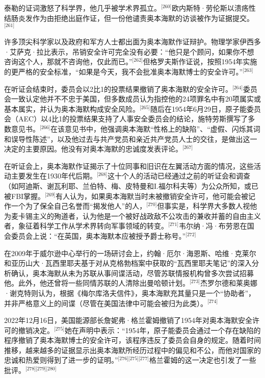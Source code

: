 泰勒的证词激怒了科学界，他几乎被学术界孤立。\(^\text{[260]}\)欧内斯特·劳伦斯以溃疡性结肠炎发作为由拒绝出庭作证，但一份他谴责奥本海默的访谈被作为证据提交。\(^\text{[261]}\)

许多顶尖科学家以及政府和军方人士都出面为奥本海默作证辩护。物理学家伊西多·艾萨克·拉比表示，吊销安全许可完全没有必要：“他只是个顾问，如果你不想咨询这个人，那就不咨询他，仅此而已。”\(^\text{[262]}\)但格罗夫斯作证说，按照1954年实施的更严格的安全标准，“如果是今天，我不会批准奥本海默博士的安全许可。”\(^\text{[263]}\)

在听证会结束时，委员会以2比1的投票结果撤销了奥本海默的安全许可。\(^\text{[264]}\)委员会一致认定他并不不忠于美国，但多数成员认为指控他的24项罪名中有20项属实或基本属实，并认为奥本海默构成安全风险。\(^\text{[265]}\)随后在1954年6月29日，原子能委员会（AEC）以4比1的投票结果支持了人事安全委员会的结论，施特劳斯撰写了多数意见书。\(^\text{[266]}\)在该意见书中，他强调奥本海默“性格上的缺陷”、“虚假、闪烁其词和误导性陈述”，以及他过去与共产党员和亲近共产党员人士的交往，是做出这一决定的主要原因。他没有对奥本海默的忠诚度发表评论。\(^\text{[267]}\)

在听证会上，奥本海默作证揭示了十位同事和旧识在左翼活动方面的情况，这些活动主要发生在1930年代后期。\(^\text{[268]}\)这十个人的活动已经通过之前的听证会和调查（如阿迪斯、谢瓦利耶、兰伯特、梅、皮特曼和I.福尔科夫等）为公众所知，或已被FBI掌握。\(^\text{[269]}\)有人认为，如果奥本海默当时未被撤销安全许可，他可能会被记作一个为了保全自己名誉而“揭发他人”的人，\(^\text{[270]}\)但事实是，科学界大多数人视他为麦卡锡主义的殉道者，认为他是一个被好战政敌不公攻击的兼收并蓄的自由主义者，象征着科学工作从学术界转向军事领域的转变。\(^\text{[271]}\)韦尔纳·冯·布劳恩在国会委员会上说：“在英国，奥本海默本应被授予爵士称号。”\(^\text{[272]}\)

在2009年于威尔逊中心举行的一场研讨会上，约翰·厄尔·海恩斯、哈维·克莱尔和亚历山大·瓦西里耶夫基于对从克格勃档案中获取的“瓦西里耶夫笔记”的深入分析确认，奥本海默从未为苏联从事间谍活动，尽管苏联情报机构曾多次尝试招募他。此外，他还曾将一些同情苏联的人清除出曼哈顿计划。\(^\text{[273]}\)杰罗尔德和莱奥娜·谢克特则认为，根据《梅尔库洛夫信件》，奥本海默充其量只是一个“协助者”，并非严格意义上的间谍（尽管在美国法律中可能会被归为此类）。\(^\text{[274]}\)

2022年12月16日，美国能源部长詹妮弗·格兰霍姆撤销了1954年对奥本海默安全许可的撤销决定。\(^\text{[275]}\)她在声明中表示：“1954年，原子能委员会通过一个存在缺陷的程序撤销了奥本海默博士的安全许可，该程序违反了委员会自身的规定。随着时间推移，越来越多的证据显示出奥本海默所经历过程中的偏见和不公，而他对国家的忠诚和热爱则得到了进一步的证明。”\(^\text{[276][275][277]}\)格兰霍姆的这一决定也引发了一些批评。\(^\text{[278][279][280]}\)
